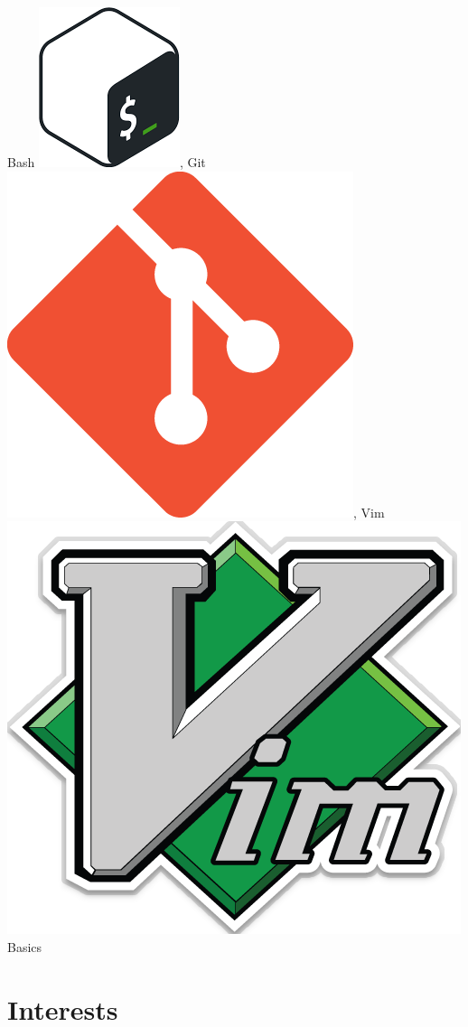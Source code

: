 \documentclass[11pt,a4paper,sans]{moderncv}
\begin{document}
{Bash \includegraphics[height=1.4\fontcharht\font`\B]{bash_logo.png}, %
Git \includegraphics[height=1.4\fontcharht\font`\B]{git_logo.png}, %
Vim \includegraphics[height=1.4\fontcharht\font`\B]{vim_logo.png}%
}{Basics}
%
%
%
\section{Interests}
%
%
%
\clearpage
%
\end{document}
